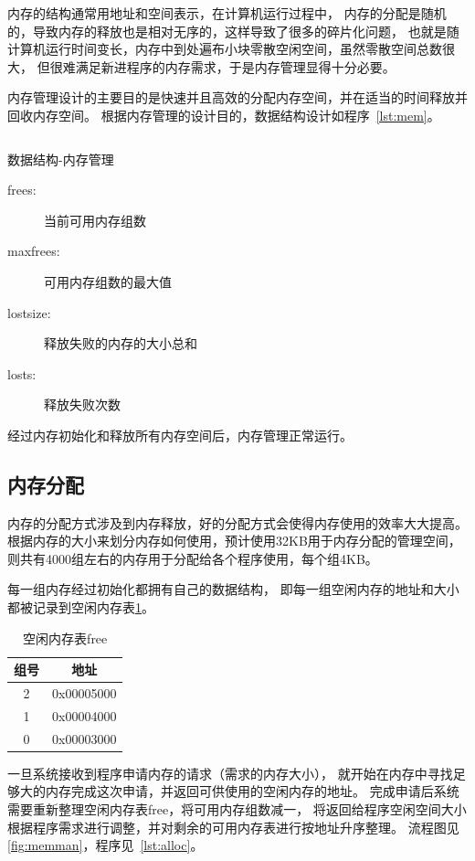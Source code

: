 内存的结构通常用地址和空间表示，在计算机运行过程中，
内存的分配是随机的，导致内存的释放也是相对无序的，这样导致了很多的碎片化问题，
也就是随计算机运行时间变长，内存中到处遍布小块零散空闲空间，虽然零散空间总数很大，
但很难满足新进程序的内存需求，于是内存管理显得十分必要。

内存管理设计的主要目的是快速并且高效的分配内存空间，并在适当的时间释放并回收内存空间。
根据内存管理的设计目的，数据结构设计如程序~\ref{lst:mem}。

\begin{listing}[H]
  \inputminted[tabsize=2, firstline=137, lastline=143,
    linenos=true]{c}{../ZOS/src/kernel/bootpack.h}
  \caption{数据结构-内存管理}
  \label{lst:mem}
\end{listing}

\begin{description}
\item[frees:]当前可用内存组数
\item[maxfrees:]可用内存组数的最大值
\item[lostsize:]释放失败的内存的大小总和
\item[losts:]释放失败次数
\end{description}

经过内存初始化和释放所有内存空间后，内存管理正常运行。

\subsection{内存分配}

内存的分配方式涉及到内存释放，好的分配方式会使得内存使用的效率大大提高。
根据内存的大小来划分内存如何使用，预计使用32KB用于内存分配的管理空间，
则共有4000组左右的内存用于分配给各个程序使用，每个组4KB。

每一组内存经过初始化都拥有自己的数据结构，
即每一组空闲内存的地址和大小都被记录到空闲内存表\ref{tab:free}。

\begin{table}[h]
  \centering
  \begin{tabular}{cc}
    \hline
    组号 & 地址 \\\hline
    2 & 0x00005000 \\ 
    1 & 0x00004000 \\
    0 & 0x00003000 \\\hline    
  \end{tabular}
  \caption{空闲内存表free}
  \label{tab:free}
\end{table}

一旦系统接收到程序申请内存的请求（需求的内存大小），
就开始在内存中寻找足够大的内存完成这次申请，并返回可供使用的空闲内存的地址。
完成申请后系统需要重新整理空闲内存表free，将可用内存组数减一，
将返回给程序空闲空间大小根据程序需求进行调整，并对剩余的可用内存表进行按地址升序整理。
流程图见\ref{fig:memman}，程序见~\ref{lst:alloc}。

